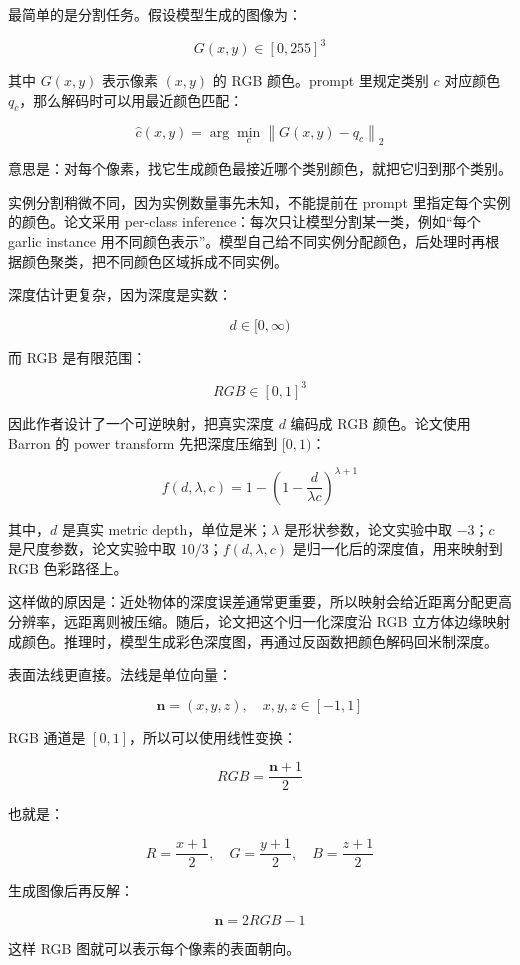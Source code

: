 最简单的是分割任务。假设模型生成的图像为：

\[
G(x, y) \in [0, 255]^3
\]

其中 \(G(x, y)\) 表示像素 \((x, y)\) 的 RGB 颜色。prompt 里规定类别 \(c\) 对应颜色 \(q_c\)，那么解码时可以用最近颜色匹配：

\[
\hat{c}(x, y) = \arg\min_c \left\|G(x, y) - q_c\right\|_2
\]

意思是：对每个像素，找它生成颜色最接近哪个类别颜色，就把它归到那个类别。

实例分割稍微不同，因为实例数量事先未知，不能提前在 prompt 里指定每个实例的颜色。论文采用 per-class inference：每次只让模型分割某一类，例如``每个 garlic instance 用不同颜色表示''。模型自己给不同实例分配颜色，后处理时再根据颜色聚类，把不同颜色区域拆成不同实例。

深度估计更复杂，因为深度是实数：

\[
d \in [0, \infty)
\]

而 RGB 是有限范围：

\[
RGB \in [0, 1]^3
\]

因此作者设计了一个可逆映射，把真实深度 \(d\) 编码成 RGB 颜色。论文使用 Barron 的 power transform 先把深度压缩到 \([0, 1)\)：

\[
f(d, \lambda, c) = 1 - \left(1 - \frac{d}{\lambda c}\right)^{\lambda + 1}
\]

其中，\(d\) 是真实 metric depth，单位是米；\(\lambda\) 是形状参数，论文实验中取 \(-3\)；\(c\) 是尺度参数，论文实验中取 \(10/3\)；\(f(d,\lambda,c)\) 是归一化后的深度值，用来映射到 RGB 色彩路径上。

这样做的原因是：近处物体的深度误差通常更重要，所以映射会给近距离分配更高分辨率，远距离则被压缩。随后，论文把这个归一化深度沿 RGB 立方体边缘映射成颜色。推理时，模型生成彩色深度图，再通过反函数把颜色解码回米制深度。

表面法线更直接。法线是单位向量：

\[
\mathbf{n} = (x, y, z), \quad x, y, z \in [-1, 1]
\]

RGB 通道是 \([0, 1]\)，所以可以使用线性变换：

\[
RGB = \frac{\mathbf{n} + 1}{2}
\]

也就是：

\[
R = \frac{x + 1}{2}, \quad G = \frac{y + 1}{2}, \quad B = \frac{z + 1}{2}
\]

生成图像后再反解：

\[
\mathbf{n} = 2RGB - 1
\]

这样 RGB 图就可以表示每个像素的表面朝向。

